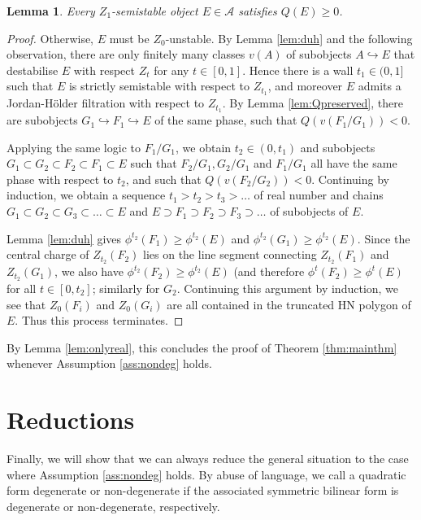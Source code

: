 \documentclass[leqno,11pt,twoside]{amsart}
\newtheorem{Lem}[Thm]{Lemma}
\theoremstyle{definition}
\begin{document}
\begin{Lem}
Every $Z_1$-semistable object $E \in {\ensuremath{\mathcal A}}$ satisfies $Q(E) \ge 0$.
\end{Lem}
\begin{proof}
Otherwise, $E$ must be $Z_0$-unstable. By Lemma \ref{lem:duh} and the following observation, there are only finitely many classes
$v(A)$ of subobjects $A {\ensuremath{\hookrightarrow}} E$ that destabilise $E$ with respect $Z_t$ for any $t\in [0,1]$. Hence
there is a wall $t_1 \in (0, 1]$ such
that $E$ is strictly semistable with respect to $Z_{t_1}$, and moreover $E$ admits a Jordan-H\"older filtration with respect to $Z_{t_1}$. By Lemma 
\ref{lem:Qpreserved}, there are subobjects $G_1 {\ensuremath{\hookrightarrow}} F_1 {\ensuremath{\hookrightarrow}} E$ of the same phase, such that
$Q(v(F_1/G_1)) < 0$.

Applying the same logic to $F_1/G_1$, we obtain $t_2 \in (0, t_1)$ and subobjects $G_1 \subset G_2 \subset F_2 \subset F_1 \subset E$
such that $F_2/G_1, G_2/G_1$ and $F_1/G_1$ all have the same phase with respect to $t_2$, and such that
$Q(v(F_2/G_2)) < 0$. Continuing by induction, we obtain a sequence $t_1 > t_2 > t_3 > \dots$ of real
number and  chains $G_1 \subset G_2 \subset G_3 \subset \dots \subset E$ and $E \supset F_1 \supset
F_2 \supset F_3 \supset \dots$ of subobjects of $E$. 

Lemma \ref{lem:duh} gives $\phi^{t_2}(F_1) \ge \phi^{t_2}(E)$ and $\phi^{t_2}(G_1) \ge
\phi^{t_2}(E)$. Since the central charge of $Z_{t_2}(F_2)$ lies on the line segment
connecting $Z_{t_2}(F_1)$ and $Z_{t_2}(G_1)$, we also have $\phi^{t_2}(F_2) \ge \phi^{t_2}(E)$ (and
therefore $\phi^{t}(F_2) \ge \phi^t(E)$ for all $t \in [0, t_2]$;
similarly for $G_2$. Continuing
this argument by induction, we see that $Z_0(F_i)$ and
$Z_0(G_i)$ are all contained in the truncated HN polygon of $E$. Thus this process terminates.
\end{proof}

By Lemma \ref{lem:onlyreal}, this concludes the proof of Theorem \ref{thm:mainthm} whenever
Assumption \ref{ass:nondeg} holds.

\section{Reductions}

Finally, we will show that we can always reduce the general situation to the case where Assumption \ref{ass:nondeg} holds.
By abuse of language, we call a quadratic form degenerate or non-degenerate if the associated symmetric bilinear form
is degenerate or non-degenerate, respectively.
\end{document}

